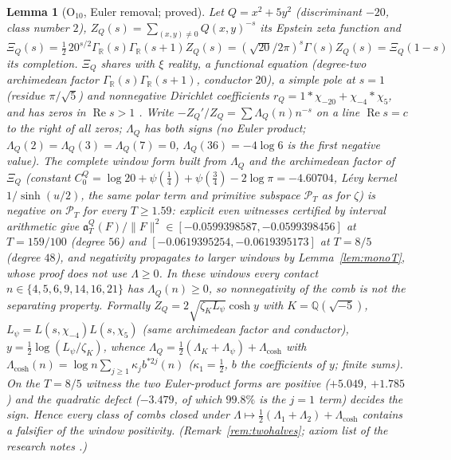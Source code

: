 \documentclass[11pt]{amsart}
\newtheorem{lemma}[theorem]{Lemma}
\theoremstyle{definition}
\theoremstyle{remark}
\newcommand{\R}{\mathbb R}
\newcommand{\Q}{\mathbb Q}
\newcommand{\Rel}{\operatorname{Re}}
\newcommand{\PT}{\mathcal P_T}
\begin{document}
\begin{lemma}[$\mathrm O_{10}$, Euler removal; proved]\label{lem:shape-epstein}
Let $Q=x^2+5y^2$ (discriminant $-20$, class number $2$), $Z_Q(s)=\sum_{(x,y)\ne0}Q(x,y)^{-s}$ its Epstein zeta function and
$\Xi_Q(s)=\tfrac12\,20^{s/2}\Gamma_\R(s)\Gamma_\R(s+1)Z_Q(s)=(\sqrt{20}/2\pi)^s\Gamma(s)Z_Q(s)=\Xi_Q(1-s)$ its completion.
$\Xi_Q$ shares with $\xi$ reality, a functional equation (degree-two archimedean factor $\Gamma_\R(s)\Gamma_\R(s+1)$, conductor
$20$), a simple pole at $s=1$ (residue $\pi/\sqrt5$) and nonnegative Dirichlet coefficients $r_Q=1*\chi_{-20}+\chi_{-4}*\chi_5$,
and has zeros in $\Rel s>1$ \cite{DavenportHeilbronn1936b}. Write $-Z_Q'/Z_Q=\sum\Lambda_Q(n)n^{-s}$ on a line $\Rel s=c$ to the
right of all zeros; $\Lambda_Q$ has both signs (no Euler product; $\Lambda_Q(2)=\Lambda_Q(3)=\Lambda_Q(7)=0$,
$\Lambda_Q(36)=-4\log6$ is the first negative value). The complete window form built from $\Lambda_Q$ and the archimedean factor
of $\Xi_Q$ (constant $C_0^Q=\log20+\psi(\tfrac14)+\psi(\tfrac34)-2\log\pi=-4.60704$, L\'evy kernel $1/\sinh(u/2)$, the same polar
term and primitive subspace $\PT$ as for $\zeta$) is negative on $\PT$ for every $T\ge1.59$: explicit even witnesses certified by
interval arithmetic give $\mathfrak a_T^Q(F)/\|F\|^2\in[-0.0599398587,-0.0599398456]$ at $T=159/100$ (degree $56$) and
$[-0.0619395254,-0.0619395173]$ at $T=8/5$ (degree $48$), and negativity propagates to larger windows by Lemma~\ref{lem:monoT},
whose proof does not use $\Lambda\ge0$. In these windows every contact $n\in\{4,5,6,9,14,16,21\}$ has $\Lambda_Q(n)\ge0$, so
nonnegativity of the comb is not the separating property. Formally $Z_Q=2\sqrt{\zeta_K L_\psi}\cosh y$ with $K=\Q(\sqrt{-5})$,
$L_\psi=L(s,\chi_{-4})L(s,\chi_5)$ (same archimedean factor and conductor), $y=\tfrac12\log(L_\psi/\zeta_K)$, whence
$\Lambda_Q=\tfrac12(\Lambda_K+\Lambda_\psi)+\Lambda_{\cosh}$ with $\Lambda_{\cosh}(n)=\log n\sum_{j\ge1}\kappa_j b^{*2j}(n)$
($\kappa_1=\tfrac12$, $b$ the coefficients of $y$; finite sums). On the $T=8/5$ witness the two Euler-product forms are positive
($+5.049$, $+1.785$) and the quadratic defect ($-3.479$, of which $99.8\%$ is the $j=1$ term) decides the sign. Hence every class of
combs closed under $\Lambda\mapsto\tfrac12(\Lambda_1+\Lambda_2)+\Lambda_{\cosh}$ contains a falsifier of the window positivity.
(Remark~\ref{rem:twohalves}; axiom list of the research notes \cite[\S18, Thms.~18.10, 18.16]{Paper46}.)
\end{lemma}
\end{document}
